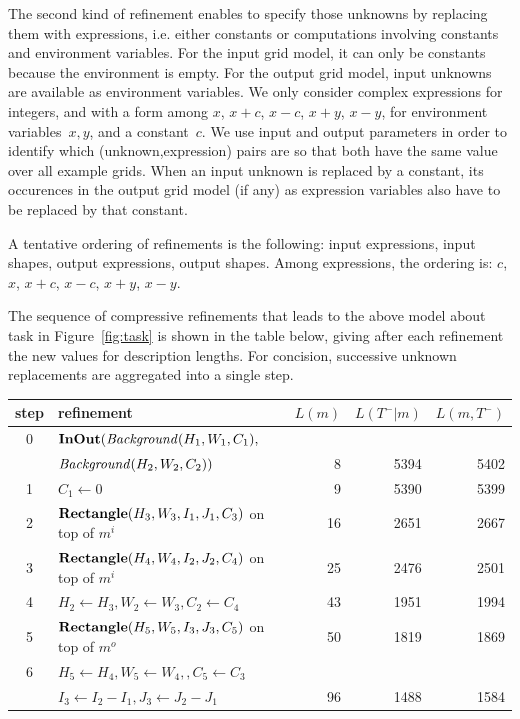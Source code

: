 \documentclass[a4paper]{llncs}
\begin{document}
The second kind of refinement enables to specify those unknowns by
replacing them with expressions, i.e. either constants or computations
involving constants and environment variables. For the input grid
model, it can only be constants because the environment is empty. For
the output grid model, input unknowns are available as environment
variables. We only consider complex expressions for integers, and with
a form among $x$, $x+c$, $x-c$, $x+y$, $x-y$, for environment
variables~$x,y$, and a constant~$c$. We use input and output
parameters in order to identify which (unknown,expression) pairs are
so that both have the same value over all example grids. When an input
unknown is replaced by a constant, its occurences in the output grid
model (if any) as expression variables also have to be replaced by
that constant.

A tentative ordering of refinements is the following: input
expressions, input shapes, output expressions, output shapes. Among
expressions, the ordering is: $c$, $x$, $x+c$, $x-c$, $x+y$, $x-y$.

The sequence of compressive refinements that leads to the above model
about task in Figure~\ref{fig:task} is shown in the table below,
giving after each refinement the new values for description
lengths. For concision, successive unknown replacements are aggregated
into a single step.

\begin{center}
  \begin{tabular}{|c|l|r|r|r|}
    \hline
    step & refinement & $L(m)$ & $L(T^-|m)$ & $L(m,T^-)$ \\
    \hline
    0 & ${\bf InOut}({\it Background}(H_1,W_1,C_1),$ & & & \\
    & \hspace*{1.1cm}${\it Background}(H_2,W_2,C_2))$ & 8 & 5394 & 5402 \\
    1 & $C_1 \leftarrow 0$ & 9 & 5390 & 5399 \\
    2 & ${\bf Rectangle}(H_3,W_3,I_1,J_1,C_3)$ on top of $m^i$ & 16 & 2651 & 2667 \\
    3 & ${\bf Rectangle}(H_4,W_4,I_2,J_2,C_4)$ on top of $m^i$ & 25 & 2476 & 2501 \\
    4 & $H_2 \leftarrow H_3, W_2 \leftarrow W_3, C_2 \leftarrow C_4$ & 43 & 1951 & 1994 \\
    5 & ${\bf Rectangle}(H_5,W_5,I_3,J_3, C_5)$ on top of $m^o$ & 50 & 1819 & 1869 \\
    6 & $H_5 \leftarrow H_4, W_5 \leftarrow W_4,, C_5 \leftarrow C_3$ & & & \\
     & \hspace*{1cm} $I_3 \leftarrow I_2-I_1, J_3 \leftarrow J_2-J_1$ & 96 & 1488 & 1584 \\
    \hline
  \end{tabular}
\end{center}
\end{document}

